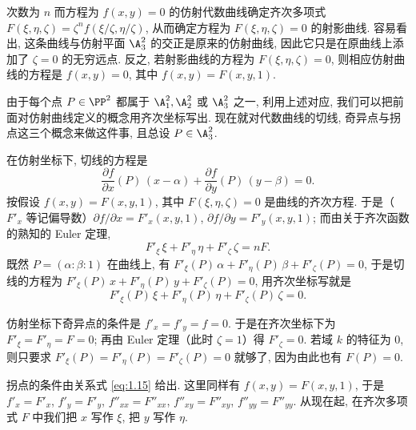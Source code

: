 次数为 $n$ 而方程为 $f(x,y) = 0$ 的仿射代数曲线确定齐次多项式 $F(\xi, \eta, \zeta) = \zeta^n f(\xi/\zeta, \eta/\zeta)$, 从而确定方程为 $F(\xi,\eta,\zeta) = 0$ 的射影曲线. 容易看出, 这条曲线与仿射平面 $\A^2_3$ 的交正是原来的仿射曲线, 因此它只是在原曲线上添加了 $\zeta = 0$ 的无穷远点. 反之, 若射影曲线的方程为 $F(\xi,\eta,\zeta) = 0$, 则相应仿射曲线的方程是 $f(x,y) = 0$, 其中 $f(x,y) = F(x, y, 1)$.

由于每个点 $P \in \PP^2$ 都属于 $\A^2_1, \A^2_2$ 或 $\A^2_3$ 之一, 利用上述对应, 我们可以把前面对仿射曲线定义的概念用齐次坐标写出. 现在就对代数曲线的切线, 奇异点与拐点这三个概念来做这件事, 且总设 $P \in \A^2_3$.

在仿射坐标下, 切线的方程是
\[
	\frac{\partial f}{\partial x}(P)\,(x - \alpha) + \frac{\partial f}{\partial y}(P)\,(y - \beta) = 0.
\]
按假设 $f(x,y) = F(x,y,1)$, 其中 $F(\xi,\eta,\zeta) = 0$ 是曲线的齐次方程. 于是（$F'_x$ 等记偏导数）$\partial f/\partial x = F'_x(x,y,1)$, $\partial f/\partial y = F'_y(x,y,1)$; 而由关于齐次函数的熟知的 Euler 定理,
\[
	F'_\xi\, \xi + F'_\eta\, \eta + F'_\zeta\, \zeta = n F.
\]
既然 $P = (\alpha : \beta : 1)$ 在曲线上, 有 $F'_\xi(P)\,\alpha + F'_\eta(P)\,\beta + F'_\zeta(P) = 0$, 于是切线的方程为 $F'_\xi(P)\,x + F'_\eta(P)\,y + F'_\zeta(P) = 0$, 用齐次坐标写就是
\[
	F'_\xi(P)\,\xi + F'_\eta(P)\,\eta + F'_\zeta(P)\,\zeta = 0.
\]

仿射坐标下奇异点的条件是 $f'_x = f'_y = f = 0$. 于是在齐次坐标下为 $F'_\xi = F'_\eta = F = 0$; 再由 Euler 定理（此时 $\zeta = 1$）得 $F'_\zeta = 0$. 若域 $k$ 的特征为 $0$, 则只要求 $F'_\xi(P) = F'_\eta(P) = F'_\zeta(P) = 0$ 就够了, 因为由此也有 $F(P) = 0$.

拐点的条件由关系式 \eqref{eq:1.15} 给出. 这里同样有 $f(x,y) = F(x,y,1)$, 于是 $f'_x = F'_x$, $f'_y = F'_y$, $f''_{xx} = F''_{xx}$, $f''_{xy} = F''_{xy}$, $f''_{yy} = F''_{yy}$. 从现在起, 在齐次多项式 $F$ 中我们把 $x$ 写作 $\xi$, 把 $y$ 写作 $\eta$.

